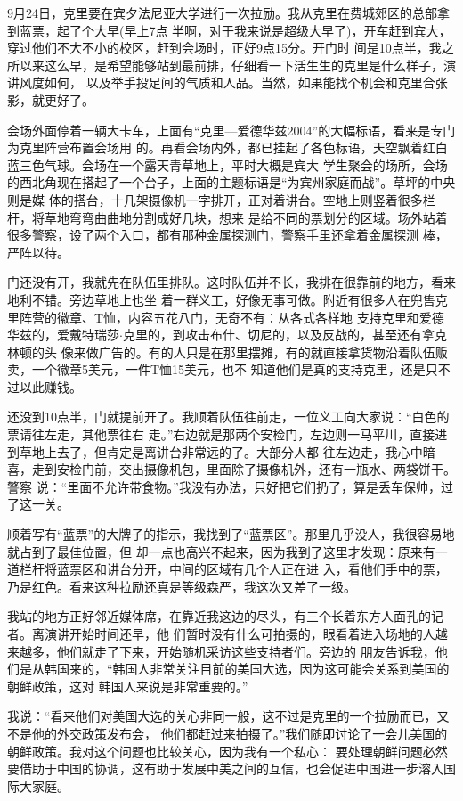 ﻿\documentclass[11pt]{article}
\begin{document}
9月24日，克里要在宾夕法尼亚大学进行一次拉励。我从克里在费城郊区的总部拿到蓝票，起了个大早(早上7点
半啊，对于我来说是超级大早了)，开车赶到宾大，穿过他们不大不小的校区，赶到会场时，正好9点15分。开门时
间是10点半，我之所以来这么早，是希望能够站到最前排，仔细看一下活生生的克里是什么样子，演讲风度如何，
以及举手投足间的气质和人品。当然，如果能找个机会和克里合张影，就更好了。

会场外面停着一辆大卡车，上面有``克里---爱德华兹2004''的大幅标语，看来是专门为克里阵营布置会场用
的。再看会场内外，都已挂起了各色标语，天空飘着红白蓝三色气球。会场在一个露天青草地上，平时大概是宾大
学生聚会的场所，会场的西北角现在搭起了一个台子，上面的主题标语是``为宾州家庭而战''。草坪的中央则是媒
体的搭台，十几架摄像机一字排开，正对着讲台。空地上则竖着很多栏杆，将草地弯弯曲曲地分割成好几块，想来
是给不同的票划分的区域。场外站着很多警察，设了两个入口，都有那种金属探测门，警察手里还拿着金属探测
棒，严阵以待。

门还没有开，我就先在队伍里排队。这时队伍并不长，我排在很靠前的地方，看来地利不错。旁边草地上也坐
着一群义工，好像无事可做。附近有很多人在兜售克里阵营的徽章、T恤，内容五花八门，无奇不有：从各式各样地
支持克里和爱德华兹的，爱戴特瑞莎$\cdot$克里的，到攻击布什、切尼的，以及反战的，甚至还有拿克林顿的头
像来做广告的。有的人只是在那里摆摊，有的就直接拿货物沿着队伍贩卖，一个徽章5美元，一件T恤15美元，也不
知道他们是真的支持克里，还是只不过以此赚钱。

还没到10点半，门就提前开了。我顺着队伍往前走，一位义工向大家说：``白色的票请往左走，其他票往右
走。''右边就是那两个安检门，左边则一马平川，直接进到草地上去了，但肯定是离讲台非常远的了。大部分人都
往左边走，我心中暗喜，走到安检门前，交出摄像机包，里面除了摄像机外，还有一瓶水、两袋饼干。警察
说：``里面不允许带食物。''我没有办法，只好把它们扔了，算是丢车保帅，过了这一关。

顺着写有``蓝票''的大牌子的指示，我找到了``蓝票区''。那里几乎没人，我很容易地就占到了最佳位置，但
却一点也高兴不起来，因为我到了这里才发现：原来有一道栏杆将蓝票区和讲台分开，中间的区域有几个人正在进
入，看他们手中的票，乃是红色。看来这种拉励还真是等级森严，我这次又差了一级。

我站的地方正好邻近媒体席，在靠近我这边的尽头，有三个长着东方人面孔的记者。离演讲开始时间还早，他
们暂时没有什么可拍摄的，眼看着进入场地的人越来越多，他们就走了下来，开始随机采访这些支持者们。旁边的
朋友告诉我，他们是从韩国来的，``韩国人非常关注目前的美国大选，因为这可能会关系到美国的朝鲜政策，这对
韩国人来说是非常重要的。''

我说：``看来他们对美国大选的关心非同一般，这不过是克里的一个拉励而已，又不是他的外交政策发布会，
他们都赶过来拍摄了。''我们随即讨论了一会儿美国的朝鲜政策。我对这个问题也比较关心，因为我有一个私心：
要处理朝鲜问题必然要借助于中国的协调，这有助于发展中美之间的互信，也会促进中国进一步溶入国际大家庭。
\end{document}
